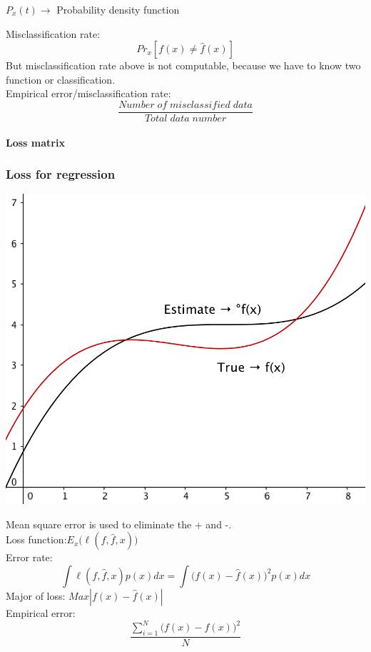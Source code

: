 \documentclass{article}
\begin{document}
{{{{            \begin{center}{
                \(P_x(t) \to \) Probability density function
            }
            \end{center}

            Misclassification rate: \[Pr_x[f(x)\not=\hat{f}(x)]\]
            But misclassification rate above is not computable, because we have to know two function or classification.\\

            Empirical error/misclassification rate: \[\frac{Number\;of\;misclassified\;data}{Total\;data\;number}\]

            \paragraph{Loss matrix}{
            }

        }
        \subsubsection{Loss for regression}{
            \begin{center}{
                \includegraphics[scale=0.5]{loss-regression.png}
            }
            \end{center}
             Mean square error is used to eliminate the + and -.\\
             Loss function:\(E_x\big(\ell(f,\hat{f},x)\big)\)\\
             Error rate: \[\int\ell(f,\hat{f},x)p(x)dx=\int\big(f(x)-\hat{f}(x)\big)^2p(x)dx\]
             Major of loss: \(Max|f(x)-\hat{f}(x)|\)\\
             Empirical error: \[\frac{\sum_{i=1}^{N}\big(f(x)-\hat{f}(x)\big)^2}{N}\]
        }
}}}
\end{document}
